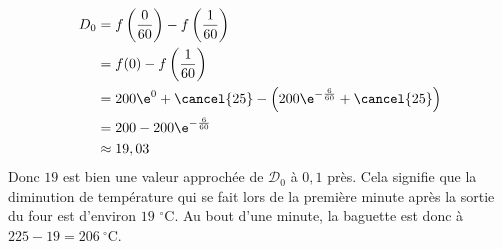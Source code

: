 \begin{enumerate}
\begin{enumerate}
\begin{align*}
{D}_0 &= f\left(\dfrac{0}{60}\right)- f\left(\dfrac{1}{60}\right) \\
&= f(0) - f\left(\dfrac{1}{60}\right) \\
&= 200\e^0 + \cancel{25} - \left(200\e^{-\frac{6}{60}} + \cancel{25}\right) \\
&= 200 - 200\e^{-\frac{6}{60}} \\
&\approx 19,03
\end{align*}
Donc $19$ est bien une valeur approchée de $\mathcal{D}_0$ à $0,1$ près. Cela signifie que la diminution de température qui se fait lors de la première minute après la sortie du four est d'environ $19$ $^{\circ}$C. Au bout d'une minute, la baguette est donc à $225-19 = 206 \ ^{\circ}$C.
		







\end{enumerate}
\end{enumerate}
